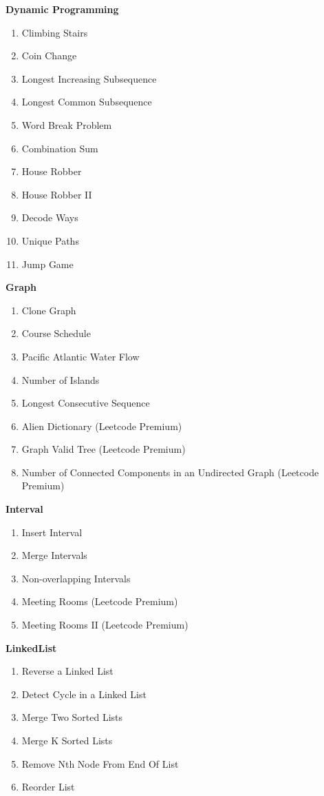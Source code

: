 \documentclass[24pt, a4]{article}
\begin{document}
\begin{multicols}{2}

\textbf{Dynamic Programming}
\begin{enumerate}
	\item{Climbing Stairs}
	\item{Coin Change}
	\item{Longest Increasing Subsequence}
	\item{Longest Common Subsequence}
	\item{Word Break Problem}
	\item{Combination Sum}
	\item{House Robber}
	\item{House Robber II}
	\item{Decode Ways}
	\item{Unique Paths}
	\item{Jump Game}
\end{enumerate}

\columnbreak

\textbf{Graph}
\begin{enumerate}
	\item{Clone Graph}
	\item{Course Schedule}
	\item{Pacific Atlantic Water Flow}
	\item{Number of Islands}
	\item{Longest Consecutive Sequence}
	\item{Alien Dictionary (Leetcode Premium)}
	\item{Graph Valid Tree (Leetcode Premium)}
	\item{Number of Connected Components in an Undirected Graph (Leetcode Premium)}
\end{enumerate}

\end{multicols}

\begin{multicols}{2}

\textbf{Interval}
\begin{enumerate}
	\item{Insert Interval}
	\item{Merge Intervals}
	\item{Non-overlapping Intervals}
	\item{Meeting Rooms (Leetcode Premium)}
	\item{Meeting Rooms II (Leetcode Premium)}
\end{enumerate}

\columnbreak

\textbf{LinkedList}
\begin{enumerate}
	\item{Reverse a Linked List}
	\item{Detect Cycle in a Linked List}
	\item{Merge Two Sorted Lists}
	\item{Merge K Sorted Lists}
	\item{Remove Nth Node From End Of List}
	\item{Reorder List}
\end{enumerate}

\end{multicols}
\end{document}
